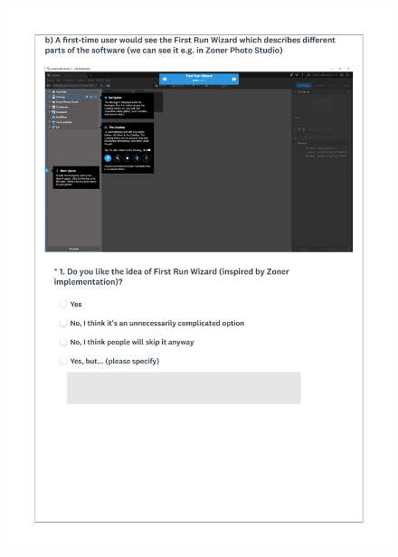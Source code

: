 \documentclass[a4paper,10pt,twoside]{article}
\begin{document}
 \newpage
 \begin{figure}[hbt!]
 \begin{center}
 \includegraphics[width=16cm]{../surveys/questionnaires/survey1_part2_page3_questions1.pdf}
 \end{center}
 \end{figure}
 
\end{document}
